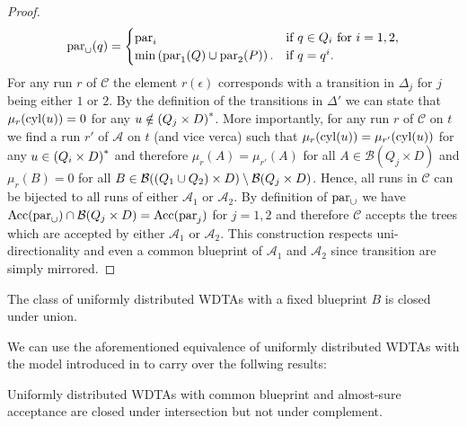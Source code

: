 \begin{proof}
\begin{equation*}
    \operatorname{par}_{\cup}(q) = \begin{cases}
      \operatorname{par}_{i}&\text{if }q\in Q_{i}\text{ for }i = 1,2,\\
      \min\left(\operatorname{par}_{1}(Q)\cup\operatorname{par}_{2}(P)\right).&\text{if }q = q^{i}.
    \end{cases}
  \end{equation*}
  For any run $r$ of $\mathcal{C}$ the element $r(\epsilon)$ corresponds with a
  transition in $\Delta_{j}$ for $j$ being either $1$ or $2$. By the definition
  of the transitions in $\Delta'$ we can state that $\mu_{r}(\operatorname{cyl}(u)) = 0$ for
  any $u\notin\left(Q_{j}\times D\right)^{*}$. More importantly, for any run $r$ of
  $\mathcal{C}$ on $t$ we find a run $r'$ of $\mathcal{A}$ on $t$ (and vice
  verca) such that $\mu_{r}(\operatorname{cyl}(u)) = \mu_{r'}(\operatorname{cyl}(u))$ for any 
  $u\in\left(Q_{i}\times D\right)^{*}$ and therefore $\mu_{r}(A) = \mu_{r'}(A)$ for
  all $A\in\mathcal{B}(Q_{j}\times D)$ and $\mu_{r}(B) = 0$ for all 
  $B\in\mathcal{B}(\left(Q_{1}\cup Q_{2}\right)\times D)
    \setminus\mathcal{B}(Q_{j}\times D)$. Hence, all runs in $\mathcal{C}$
  can be bijected to all runs of either $\mathcal{A}_{1}$ or $\mathcal{A}_{2}$.
  By definition of $\operatorname{par}_{\cup}$ we have 
  $\operatorname{Acc}(\operatorname{par}_{\cup})\cap\mathcal{B}(Q_{j}\times D) = \operatorname{Acc}(\operatorname{par}_{j})$ for
  $j = 1,2$ and therefore $\mathcal{C}$ accepts the trees which are accepted by 
  either $\mathcal{A}_{1}$ or $\mathcal{A}_{2}$. This construction respects 
  uni-directionality and even a common blueprint of $\mathcal{A}_{1}$ and 
  $\mathcal{A}_{2}$ since transition are simply mirrored.
\end{proof}

\begin{corollary}
  The class of uniformly distributed \acp{WDTA} with a fixed blueprint $B$ is 
  closed under union.
\end{corollary}

We can use the aforementioned equivalence of uniformly distributed \acp{WDTA} 
with the model introduced in \cite{RandAutoInfTrees} to carry over the follwing
results:
\begin{proposition}
  \cite[Proposition 14, Proposition 15]{RandAutoInfTrees}
  Uniformly distributed \acp{WDTA} with common blueprint and almost-sure 
  acceptance are closed under intersection but not under complement.
\end{proposition}

